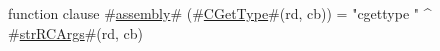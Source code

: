 function clause #\hyperref[sailMIPSzassembly]{assembly}# (#\hyperref[sailMIPSzCGetType]{CGetType}#(rd, cb)) = "cgettype " ^ #\hyperref[sailMIPSzstrRCArgs]{strRCArgs}#(rd, cb)
